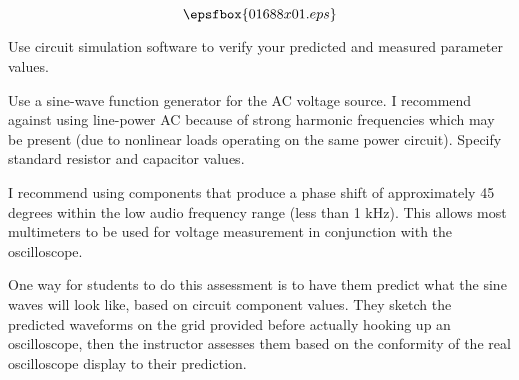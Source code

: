 

$$\epsfbox{01688x01.eps}$$

\vfil \eject






Use circuit simulation software to verify your predicted and measured parameter values.







Use a sine-wave function generator for the AC voltage source.  I recommend against using line-power AC because of strong harmonic frequencies which may be present (due to nonlinear loads operating on the same power circuit).  Specify standard resistor and capacitor values.

I recommend using components that produce a phase shift of approximately 45 degrees within the low audio frequency range (less than 1 kHz).  This allows most multimeters to be used for voltage measurement in conjunction with the oscilloscope.

One way for students to do this assessment is to have them predict what the sine waves will look like, based on circuit component values.  They sketch the predicted waveforms on the grid provided before actually hooking up an oscilloscope, then the instructor assesses them based on the conformity of the real oscilloscope display to their prediction.




